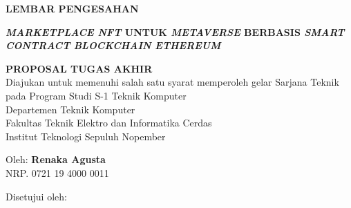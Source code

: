 \begin{center}
	\large
  \textbf{LEMBAR PENGESAHAN}
\end{center}

\thispagestyle{empty}

\begin{center}
  \textbf{\emph{MARKETPLACE NFT} UNTUK \emph{METAVERSE} BERBASIS \emph{SMART CONTRACT} \emph{BLOCKCHAIN ETHEREUM}}
\end{center}

\begingroup
  \small

  \begin{center}
    \textbf{PROPOSAL TUGAS AKHIR} \\
    Diajukan untuk memenuhi salah satu syarat memperoleh gelar
    Sarjana Teknik pada 
    Program Studi S-1 Teknik Komputer \\
    Departemen Teknik Komputer \\
    Fakultas Teknik Elektro dan Informatika Cerdas \\
    Institut Teknologi Sepuluh Nopember
  \end{center}

  \begin{center}
    Oleh: \textbf{Renaka Agusta} \\
    NRP. 0721 19 4000 0011
  \end{center}

  \begin{center}
    Disetujui oleh:
  \end{center}

  \begingroup
    \setlength{\tabcolsep}{0pt}

